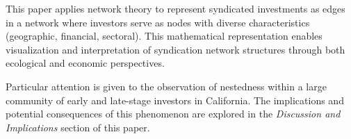 This paper applies network theory to represent syndicated investments as edges in a network where investors serve as nodes with diverse characteristics (geographic, financial, sectoral). This mathematical representation enables visualization and interpretation of syndication network structures through both ecological and economic perspectives.

Particular attention is given to the observation of nestedness within a large community of early and late-stage investors in California. The implications and potential consequences of this phenomenon are explored in the \textit{Discussion and Implications} section of this paper.